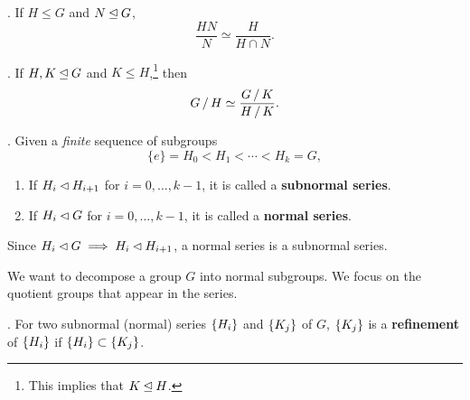 \thm.  If \(H \leq G\) and \(N \unlhd G\),
\[
    \frac{HN}{N} \simeq \frac{H}{H\cap N}.
\]
\begin{center}
\end{center}

\thm.  If \(H, K \unlhd G\) and \(K \leq H\),\footnote{This implies that \(K \unlhd H\).} then
\[
    G \operatorname{/} H \simeq \frac{G \operatorname{/} K}{H \operatorname{/} K}.
\]


. Given a \textit{finite} sequence of subgroups
\[
    \{e\} = H_0 < H_1 < \cdots < H_k = G,
\]
\begin{enumerate}
    \item {} If \(H_i \lhd H_{i+1}\) for \(i = 0, \dots, k - 1\), it is called a \textbf{subnormal series}.
    \item {} If \(H_i \lhd G\) for \(i = 0, \dots, k - 1\), it is called a \textbf{normal series}.
\end{enumerate}

\rmk Since \(H_i \lhd G \implies H_i \lhd H_{i+1}\), a normal series is a subnormal series.

We want to decompose a group \(G\) into normal subgroups. We focus on the quotient groups that appear in the series.

.  For two subnormal (normal) series \(\left\{ H_i \right\}\) and \(\left\{ K_j \right\}\) of \(G\), \(\left\{ K_j \right\}\) is a \textbf{refinement} of \(\left\{ H_i \right\}\) if \(\left\{ H_i \right\} \subset \left\{ K_j \right\}\).

